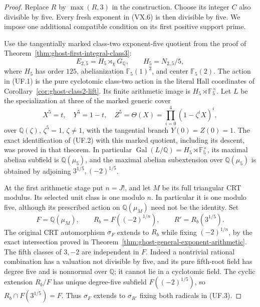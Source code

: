 \begin{proof}
Replace \(R\) by \(\max(R,3)\) in the construction.
Choose its integer \(C\) also divisible by five.
Every fresh exponent in (VX.6) is then divisible
by five. We impose one additional compatible
condition on its first positive support prime.

Use the tangentially marked class-two exponent-five
quotient from the proof of
Theorem~\ref{thm:ghost-first-integral-class3}:
\[
 E_{2,5}=H_5\rtimes_{\chi}G_{\mathbb Q},
 \qquad H_5=N_{2,5}/5,
 \tag{UF.1}
\]
where \(H_5\) has order \(125\), abelianization
\(\mathbb F_5(1)^2\), and center
\(\mathbb F_5(2)\). The action in (UF.1) is
the pure cyclotomic class-two action in the
literal Hall coordinates of
Corollary~\ref{cor:ghost-class2-lift}.
Its finite arithmetic image is
\(H_5\rtimes\mathbb F_5^\times\).
Let \(L\) be the specialization at three of
the marked generic cover
\[
 X^5=t,\quad Y^5=1-t,\quad
 Z^5=\Theta(X)=\prod_{i=0}^4(1-\zeta^iX)^i,
 \tag{UF.2}
\]
over \(\mathbb Q(\zeta)\), \(\zeta^5=1\),
\(\zeta\ne1\), with the tangential branch
\(Y(0)=Z(0)=1\). The exact identification of
(UF.2) with this marked quotient, including
its descent, was proved in that theorem.
In particular \(\operatorname{Gal}(L/\mathbb Q)
 =H_5\rtimes\mathbb F_5^\times\), its maximal
abelian subfield is \(\mathbb Q(\mu_5)\), and
the maximal abelian subextension over
\(\mathbb Q(\mu_5)\) is obtained by adjoining
\(3^{1/5},(-2)^{1/5}\).

At the first arithmetic stage put \(n=J!\),
and let \(M\) be its full triangular CRT
modulus. Its selected unit class is one
modulo \(n\). In particular it is one
modulo five, although its prescribed action
on \(\mathbb Q(\mu_M)\) need not be the identity.
Set
\[
 F=\mathbb Q(\mu_M),\qquad
 R_b=F((-2)^{1/n}),\qquad
 R'=R_b(3^{1/5}).
 \tag{UF.3}
\]
The original CRT automorphism \(\sigma_F\)
extends to \(R_b\) while fixing \((-2)^{1/n}\),
by the exact intersection proved in
Theorem~\ref{thm:ghost-general-exponent-arithmetic}.
The fifth classes of \(3,-2\) are independent
in \(F\). Indeed a nontrivial rational
combination has a valuation not divisible
by five, and its pure fifth-root field has
degree five and is nonnormal over
\(\mathbb Q\); it cannot lie in a cyclotomic
field. The cyclic extension \(R_b/F\) has
unique degree-five subfield
\(F((-2)^{1/5})\), so
\(R_b\cap F(3^{1/5})=F\). Thus
\(\sigma_F\) extends to \(\sigma_{R'}\)
fixing both radicals in (UF.3).


\end{proof}
